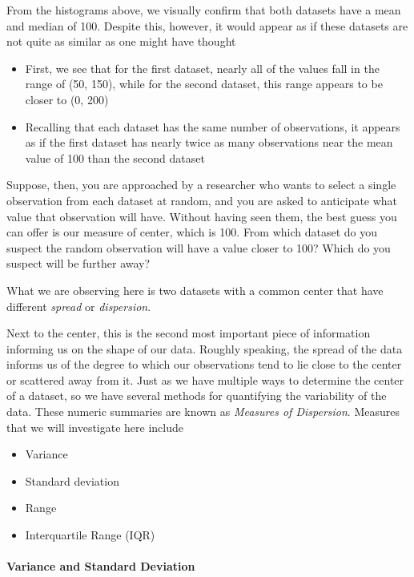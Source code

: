 \documentclass[
]{book}
\providecommand{\tightlist}{%
  \setlength{\itemsep}{0pt}\setlength{\parskip}{0pt}}
\theoremstyle{definition}
\theoremstyle{definition}
\theoremstyle{definition}
\theoremstyle{remark}
\begin{document}
From the histograms above, we visually confirm that both datasets have a mean and median of 100. Despite this, however, it would appear as if these datasets are not quite as similar as one might have thought

\begin{itemize}
\item
  First, we see that for the first dataset, nearly all of the values fall in the range of (50, 150), while for the second dataset, this range appears to be closer to (0, 200)
\item
  Recalling that each dataset has the same number of observations, it appears as if the first dataset has nearly twice as many observations near the mean value of 100 than the second dataset
\end{itemize}

Suppose, then, you are approached by a researcher who wants to select a single observation from each dataset at random, and you are asked to anticipate what value that observation will have. Without having seen them, the best guess you can offer is our measure of center, which is 100. From which dataset do you suspect the random observation will have a value closer to 100? Which do you suspect will be further away?

What we are observing here is two datasets with a common center that have different \emph{spread} or \emph{dispersion}.

Next to the center, this is the second most important piece of information informing us on the shape of our data. Roughly speaking, the spread of the data informs us of the degree to which our observations tend to lie close to the center or scattered away from it. Just as we have multiple ways to determine the center of a dataset, so we have several methods for quantifying the variability of the data. These numeric summaries are known as \emph{Measures of Dispersion}. Measures that we will investigate here include

\begin{itemize}
\tightlist
\item
  Variance
\item
  Standard deviation
\item
  Range
\item
  Interquartile Range (IQR)
\end{itemize}

\hypertarget{variance-and-standard-deviation}{%
\paragraph{Variance and Standard Deviation}\label{variance-and-standard-deviation}}
\end{document}
